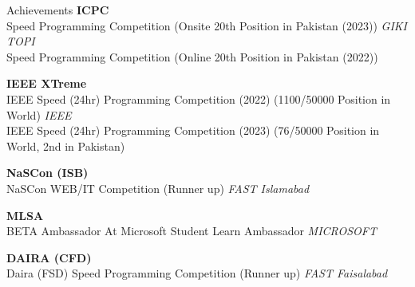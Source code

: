 \documentclass{resume}
\begin{document}
\begin{rSection}{Achievements} 
\textbf{ICPC } \\
Speed Programming Competition (Onsite 20th Position in Pakistan (2023)) \hfill \textit{GIKI TOPI}
\\ Speed Programming Competition (Online 20th Position in Pakistan (2022))

\textbf{IEEE XTreme } \\
IEEE Speed (24hr) Programming Competition (2022) (1100/50000 Position in World) \hfill \textit{IEEE}
\\ IEEE Speed (24hr) Programming Competition (2023) (76/50000 Position in World, 2nd in Pakistan)

\textbf{NaSCon (ISB) } \\
NaSCon WEB/IT Competition  (Runner up) \hfill \textit{FAST Islamabad}

\textbf{MLSA } \\
BETA Ambassador At Microsoft Student Learn Ambassador \hfill \textit{MICROSOFT}

\textbf{DAIRA (CFD) } \\
Daira (FSD) Speed Programming Competition (Runner up) \hfill \textit{FAST Faisalabad}






\end{rSection}
\end{document}
